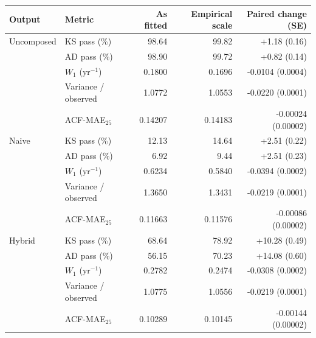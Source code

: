 \begin{tabular}{@{}llrrr@{}}
\toprule
Output & Metric & As fitted & Empirical scale & Paired change (SE) \\
\midrule
Uncomposed & KS pass (\%) & 98.64 & 99.82 & +1.18 (0.16) \\
 & AD pass (\%) & 98.90 & 99.72 & +0.82 (0.14) \\
 & $W_1$ ($\mathrm{yr}^{-1}$) & 0.1800 & 0.1696 & -0.0104 (0.0004) \\
 & Variance / observed & 1.0772 & 1.0553 & -0.0220 (0.0001) \\
 & ACF-MAE$_{25}$ & 0.14207 & 0.14183 & -0.00024 (0.00002) \\
\midrule
Naive & KS pass (\%) & 12.13 & 14.64 & +2.51 (0.22) \\
 & AD pass (\%) & 6.92 & 9.44 & +2.51 (0.23) \\
 & $W_1$ ($\mathrm{yr}^{-1}$) & 0.6234 & 0.5840 & -0.0394 (0.0002) \\
 & Variance / observed & 1.3650 & 1.3431 & -0.0219 (0.0001) \\
 & ACF-MAE$_{25}$ & 0.11663 & 0.11576 & -0.00086 (0.00002) \\
\midrule
Hybrid & KS pass (\%) & 68.64 & 78.92 & +10.28 (0.49) \\
 & AD pass (\%) & 56.15 & 70.23 & +14.08 (0.60) \\
 & $W_1$ ($\mathrm{yr}^{-1}$) & 0.2782 & 0.2474 & -0.0308 (0.0002) \\
 & Variance / observed & 1.0775 & 1.0556 & -0.0219 (0.0001) \\
 & ACF-MAE$_{25}$ & 0.10289 & 0.10145 & -0.00144 (0.00002) \\
\bottomrule
\end{tabular}
